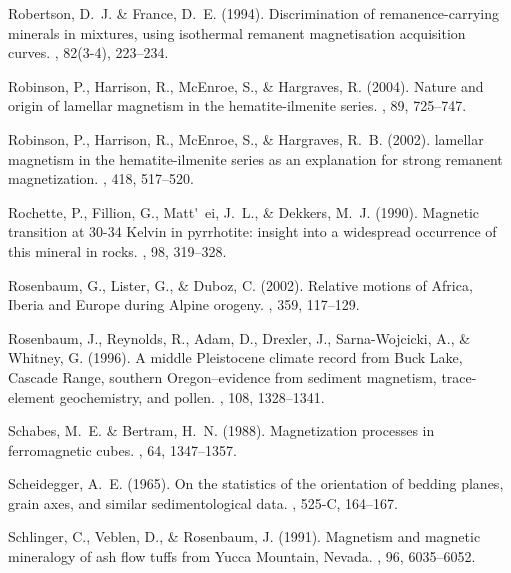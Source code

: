 \documentclass[11pt]{book}
\begin{document}
\begin{thebibliography}{}
Robertson, D.~J. \& France, D.~E. (1994).
\newblock Discrimination of remanence-carrying minerals in mixtures, using
  isothermal remanent magnetisation acquisition curves.
, 82(3-4), 223--234.

Robinson, P., Harrison, R., McEnroe, S., \& Hargraves, R. (2004).
\newblock Nature and origin of lamellar magnetism in the hematite-ilmenite
  series.
, 89, 725--747.

Robinson, P., Harrison, R., McEnroe, S., \& Hargraves, R.~B. (2002).
\newblock lamellar magnetism in the hematite-ilmenite series as an explanation
  for strong remanent magnetization.
, 418, 517--520.

Rochette, P., Fillion, G., Matt\'~ei, J.~L., \& Dekkers, M.~J. (1990).
\newblock Magnetic transition at 30-34 Kelvin in pyrrhotite: insight into a
  widespread occurrence of this mineral in rocks.
, 98, 319--328.

Rosenbaum, G., Lister, G., \& Duboz, C. (2002).
\newblock Relative motions of Africa, Iberia and Europe during Alpine orogeny.
, 359, 117--129.

Rosenbaum, J., Reynolds, R., Adam, D., Drexler, J., Sarna-Wojcicki, A., \&
  Whitney, G. (1996).
\newblock A middle Pleistocene climate record from Buck Lake, Cascade Range,
  southern Oregon--evidence from sediment magnetism, trace-element
  geochemistry, and pollen.
, 108, 1328--1341.

Schabes, M.~E. \& Bertram, H.~N. (1988).
\newblock Magnetization processes in ferromagnetic cubes.
, 64, 1347--1357.

Scheidegger, A.~E. (1965).
\newblock On the statistics of the orientation of bedding planes, grain axes,
  and similar sedimentological data.
, 525-C, 164--167.

Schlinger, C., Veblen, D., \& Rosenbaum, J. (1991).
\newblock Magnetism and magnetic mineralogy of ash flow tuffs from Yucca
  Mountain, Nevada.
, 96, 6035--6052.


\end{thebibliography}
\end{document}
